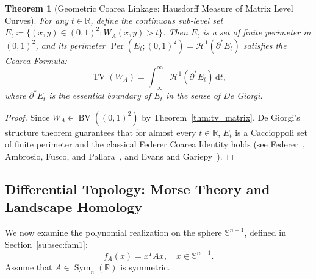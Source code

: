 \documentclass[11pt,a4paper,reqno]{amsart}
\newtheorem{theorem}{Theorem}[section]
\theoremstyle{definition}
\numberwithin{equation}{section}
\providecommand{\R}{\mathbb{R}}
\providecommand{\Sph}{\mathbb{S}}
\providecommand{\BV}{\operatorname{BV}}
\providecommand{\TV}{\operatorname{TV}}
\newcommand{\Per}{\operatorname{Per}}
\newcommand{\dif}{\,\mathrm{d}}
\providecommand{\Sph}{\mathbb{S}}
\providecommand{\R}{\mathbb{R}}
\providecommand{\BV}{\mathrm{BV}}
\providecommand{\TV}{\mathrm{TV}}
\begin{document}
\begin{theorem}[Geometric Coarea Linkage: Hausdorff Measure of Matrix Level Curves]
\label{thm:coarea_linkage}
For any $t \in \R$, define the continuous sub-level set $E_t \coloneqq \{(x, y) \in (0, 1)^2 \colon W_A(x, y) > t\}$. Then $E_t$ is a set of finite perimeter in $(0, 1)^2$, and its perimeter $\Per(E_t; (0,1)^2) = \mathcal{H}^1(\partial^* E_t)$ satisfies the \emph{Coarea Formula}:
\begin{equation}
    \label{eq:coarea}
    \TV(W_A) = \int_{-\infty}^\infty \mathcal{H}^1(\partial^* E_t) \dif t,
\end{equation}
where $\partial^* E_t$ is the essential boundary of $E_t$ in the sense of De Giorgi.
\end{theorem}
\begin{proof}
Since $W_A \in \BV((0,1)^2)$ by Theorem~\ref{thm:tv_matrix}, De Giorgi's structure theorem guarantees that for almost every $t \in \R$, $E_t$ is a Caccioppoli set of finite perimeter and the classical Federer Coarea Identity holds (see Federer~\cite{federer1969geometric}, Ambrosio, Fusco, and Pallara~\cite{ambrosio2000functions}, and Evans and Gariepy~\cite{evans2015measure}).
\end{proof}

\subsection{Differential Topology: Morse Theory and Landscape Homology}
\label{subsec:morse}

We now examine the polynomial realization on the sphere $\Sph^{n-1}$, defined in Section~\ref{subsec:fam1}:
\begin{equation}
    f_A(x) = x^T A x, \quad x \in \Sph^{n-1}.
\end{equation}
Assume that $A \in \operatorname{Sym}_n(\R)$ is symmetric.
\end{document}
